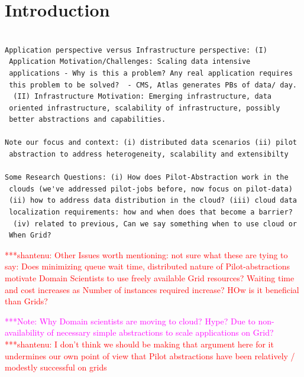 \documentclass[times]{cpeauth}
\newcommand{\jhanote}[1]{ {\textcolor{red} { ***shantenu: #1 }}}
\newcommand{\note}[1]{ {\textcolor{magenta} { ***Note: #1 }}}
\newcommand{\jhanote}[1]{}
\newcommand{\note}[1]{}
\begin{document}
\maketitle


\vspace{-6pt}

\section{Introduction}
\vspace{-2pt}

\begin{verbatim}

Application perspective versus Infrastructure perspective: (I)
 Application Motivation/Challenges: Scaling data intensive
 applications - Why is this a problem? Any real application requires
 this problem to be solved?  - CMS, Atlas generates PBs of data/ day.
  (II) Infrastructure Motivation: Emerging infrastructure, data
 oriented infrastructure, scalability of infrastructure, possibly
 better abstractions and capabilities.

Note our focus and context: (i) distributed data scenarios (ii) pilot
 abstraction to address heterogeneity, scalability and extensibilty

Some Research Questions: (i) How does Pilot-Abstraction work in the
 clouds (we've addressed pilot-jobs before, now focus on pilot-data)
 (ii) how to address data distribution in the cloud? (iii) cloud data
 localization requirements: how and when does that become a barrier?
  (iv) related to previous, Can we say something when to use cloud or
 When Grid?

\end{verbatim}

\jhanote{Other Issues worth mentioning: not sure what these are tying
 to say: Does minimizing queue wait time, distributed nature of
 Pilot-abstractions motivate Domain Scientists to use freely available
 Grid resources?  Waiting time and cost increases as Number of
 instances required increase?  HOw is it beneficial than Grids?}


\note{Why Domain scientists are moving to cloud? Hype? Due to
  non-availability of necessary simple abstractions to scale
  applications on Grid?} \jhanote{I don't think we should be making
    that argument here for it undermines our own point of view that
    Pilot abstractions have been relatively / modestly successful on
    grids}
\end{document}
